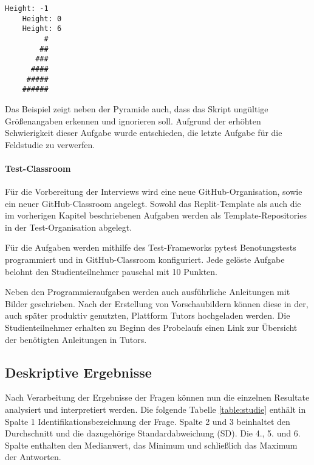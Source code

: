 \begin{lstlisting}[style=Bash]
    Height: -1
    Height: 0
    Height: 6
         #
        ##
       ###
      ####
     #####
    ######
\end{lstlisting}

Das Beispiel zeigt neben der Pyramide auch, dass das Skript ungültige
Größenangaben erkennen und ignorieren soll. Aufgrund der erhöhten Schwierigkeit
dieser Aufgabe wurde entschieden, die letzte Aufgabe für die Feldstudie zu
verwerfen.

\paragraph{Test-Classroom}
Für die Vorbereitung der Interviews wird eine neue GitHub-Organisation, sowie
ein neuer GitHub-Classroom angelegt. Sowohl das Replit-Template als auch die im
vorherigen Kapitel beschriebenen Aufgaben werden als Template-Repositories in
der Test-Organisation abgelegt.

Für die Aufgaben werden mithilfe des Test-Frameworks pytest Benotungstests
programmiert und in GitHub-Classroom konfiguriert. Jede gelöste Aufgabe belohnt
den Studienteilnehmer pauschal mit 10 Punkten.

Neben den Programmieraufgaben werden auch ausführliche Anleitungen mit Bilder
geschrieben. Nach der Erstellung von Vorschaubildern können diese in der,
auch später produktiv genutzten, Plattform Tutors hochgeladen werden. Die
Studienteilnehmer erhalten zu Beginn des Probelaufs einen Link zur Übersicht der benötigten Anleitungen in Tutors.

\newpage
\subsection{Deskriptive Ergebnisse}
Nach Verarbeitung der Ergebnisse der Fragen können nun die einzelnen Resultate
analysiert und interpretiert werden. Die folgende Tabelle \ref{table:studie}
enthält in Spalte 1 Identifikationsbezeichnung der Frage. Spalte 2 und 3
beinhaltet den Durchschnitt und die dazugehörige Standardabweichung (SD).
Die 4., 5. und 6. Spalte enthalten den Medianwert, das Minimum und 
schließlich das Maximum der Antworten.


